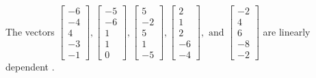\begin{exercise}
\begin{exerciseStatement}
  \end{exerciseStatement}
  \begin{exerciseAnswer}
   The vectors \(\left[\begin{array}{r}
-6 \\
-4 \\
4 \\
-3 \\
-1
\end{array}\right] , \left[\begin{array}{r}
-5 \\
-6 \\
1 \\
1 \\
0
\end{array}\right] , \left[\begin{array}{r}
5 \\
-2 \\
5 \\
1 \\
-5
\end{array}\right] , \left[\begin{array}{r}
2 \\
1 \\
2 \\
-6 \\
-4
\end{array}\right] , \text{ and } \left[\begin{array}{r}
-2 \\
4 \\
6 \\
-8 \\
-2
\end{array}\right]\) are 
  	 linearly dependent  .
  


  \end{exerciseAnswer}
\end{exercise}